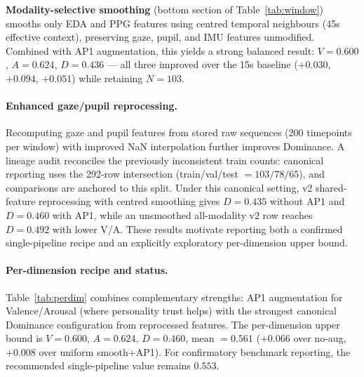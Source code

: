 \documentclass[sigconf,nonacm]{acmart}
\begin{document}
\textbf{Modality-selective smoothing} (bottom section of Table~\ref{tab:window})
smooths only EDA and PPG features using centred temporal neighbours (45s
effective context), preserving gaze, pupil, and IMU features unmodified.
Combined with AP1 augmentation, this yields a strong balanced result:
$V{=}0.600$, $A{=}0.624$, $D{=}0.436$ --- all three improved over the 15s
baseline ($+0.030$, $+0.094$, $+0.051$) while retaining $N{=}103$.

\paragraph{Enhanced gaze/pupil reprocessing.}
Recomputing gaze and pupil features from stored raw sequences (200 timepoints
per window) with improved NaN interpolation further improves Dominance.
A lineage audit reconciles the previously inconsistent train counts:
canonical reporting uses the 292-row intersection (train/val/test
$=103/78/65$), and comparisons are anchored to this split.
Under this canonical setting, v2 shared-feature reprocessing with centred
smoothing gives $D{=}0.435$ without AP1 and $D{=}0.460$ with AP1, while an
unsmoothed all-modality v2 row reaches $D{=}0.492$ with lower V/A.
These results motivate reporting both a confirmed single-pipeline recipe and
an explicitly exploratory per-dimension upper bound.

\paragraph{Per-dimension recipe and status.}
Table~\ref{tab:perdim} combines complementary strengths: AP1 augmentation for
Valence/Arousal (where personality trust helps) with the strongest canonical
Dominance configuration from reprocessed features.
The per-dimension upper bound is $V{=}0.600$, $A{=}0.624$, $D{=}0.460$,
mean $= 0.561$ ($+0.066$ over no-aug, $+0.008$ over uniform smooth+AP1).
For confirmatory benchmark reporting, the recommended single-pipeline value
remains $0.553$.
\end{document}
